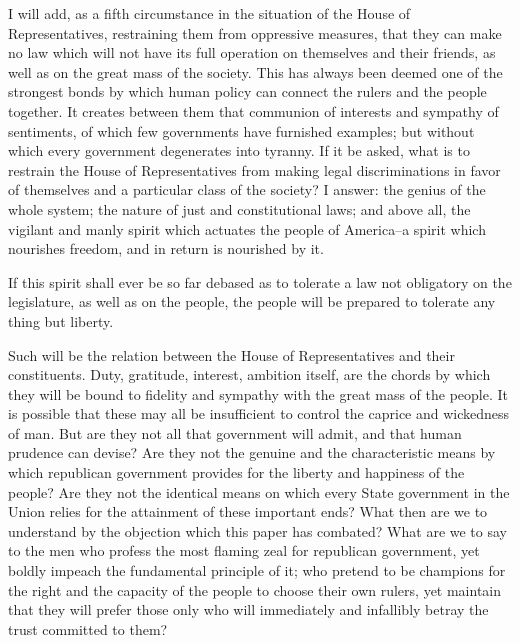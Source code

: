 I will add, as a fifth circumstance in the situation of the House of Representatives, restraining them from oppressive measures, that they can make no law which will not have its full operation on themselves and their friends, as well as on the great mass of the society. This has always been deemed one of the strongest bonds by which human policy can connect the rulers and the people together. It creates between them that communion of interests and sympathy of sentiments, of which few governments have furnished examples; but without which every government degenerates into tyranny. If it be asked, what is to restrain the House of Representatives from making legal discriminations in favor of themselves and a particular class of the society? I answer: the genius of the whole system; the nature of just and constitutional laws; and above all, the vigilant and manly spirit which actuates the people of America--a spirit which nourishes freedom, and in return is nourished by it.

If this spirit shall ever be so far debased as to tolerate a law not obligatory on the legislature, as well as on the people, the people will be prepared to tolerate any thing but liberty.

Such will be the relation between the House of Representatives and their constituents. Duty, gratitude, interest, ambition itself, are the chords by which they will be bound to fidelity and sympathy with the great mass of the people. It is possible that these may all be insufficient to control the caprice and wickedness of man. But are they not all that government will admit, and that human prudence can devise? Are they not the genuine and the characteristic means by which republican government provides for the liberty and happiness of the people? Are they not the identical means on which every State government in the Union relies for the attainment of these important ends? What then are we to understand by the objection which this paper has combated? What are we to say to the men who profess the most flaming zeal for republican government, yet boldly impeach the fundamental principle of it; who pretend to be champions for the right and the capacity of the people to choose their own rulers, yet maintain that they will prefer those only who will immediately and infallibly betray the trust committed to them?

